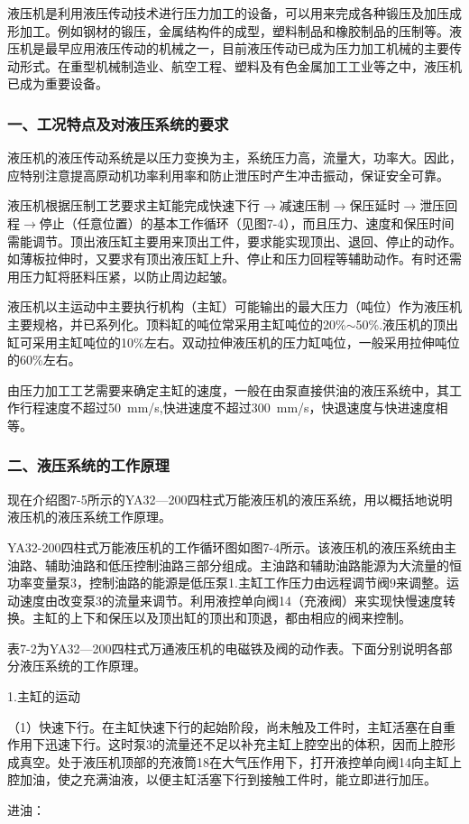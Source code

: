 液压机是利用液压传动技术进行压力加工的设备，可以用来完成各种锻压及加压成形加工。例如钢材的锻压，金属结构件的成型，塑料制品和橡胶制品的压制等。液压机是最早应用液压传动的机械之一，目前液压传动已成为压力加工机械的主要传动形式。在重型机械制造业、航空工程、塑料及有色金属加工工业等之中，液压机已成为重要设备。

\subsubsection*{一、工况特点及对液压系统的要求}

液压机的液压传动系统是以压力变换为主，系统压力高，流量大，功率大。因此，应特别注意提高原动机功率利用率和防止泄压时产生冲击振动，保证安全可靠。

液压机根据压制工艺要求主缸能完成快速下行$\rightarrow$减速压制$\rightarrow$保压延时$\rightarrow$泄压回程$\rightarrow$停止（任意位置）的基本工作循环（见图7-4），而且压力、速度和保压时间需能调节。顶出液压缸主要用来顶出工件，要求能实现顶出、退回、停止的动作。如薄板拉伸时，又要求有顶出液压缸上升、停止和压力回程等辅助动作。有时还需用压力缸将胚料压紧，以防止周边起皱。

液压机以主运动中主要执行机构（主缸）可能输出的最大压力（吨位）作为液压机主要规格，并已系列化。顶料缸的吨位常采用主缸吨位的20\%$\sim$50\%.液压机的顶出缸可采用主缸吨位的10\%左右。双动拉伸液压机的压力缸吨位，一般采用拉伸吨位的60\%左右。

由压力加工工艺需要来确定主缸的速度，一般在由泵直接供油的液压系统中，其工作行程速度不超过50\ mm/s,快进速度不超过300\ mm/s，快退速度与快进速度相等。

\subsubsection*{二、液压系统的工作原理}

现在介绍图7-5所示的YA32—200四柱式万能液压机的液压系统，用以概括地说明液压机的液压系统工作原理。

YA32-200四柱式万能液压机的工作循环图如图7-4所示。该液压机的液压系统由主油路、辅助油路和低压控制油路三部分组成。主油路和辅助油路能源为大流量的恒功率变量泵3，控制油路的能源是低压泵1.主缸工作压力由远程调节阀9来调整。运动速度由改变泵3的流量来调节。利用液控单向阀14（充液阀）来实现快慢速度转换。主缸的上下和保压以及顶出缸的顶出和顶退，都由相应的阀来控制。

表7-2为YA32—200四柱式万通液压机的电磁铁及阀的动作表。下面分别说明各部分液压系统的工作原理。

1.主缸的运动

（1）快速下行。在主缸快速下行的起始阶段，尚未触及工件时，主缸活塞在自重作用下迅速下行。这时泵3的流量还不足以补充主缸上腔空出的体积，因而上腔形成真空。处于液压机顶部的充液筒18在大气压作用下，打开液控单向阀14向主缸上腔加油，使之充满油液，以便主缸活塞下行到接触工件时，能立即进行加压。

进油：
